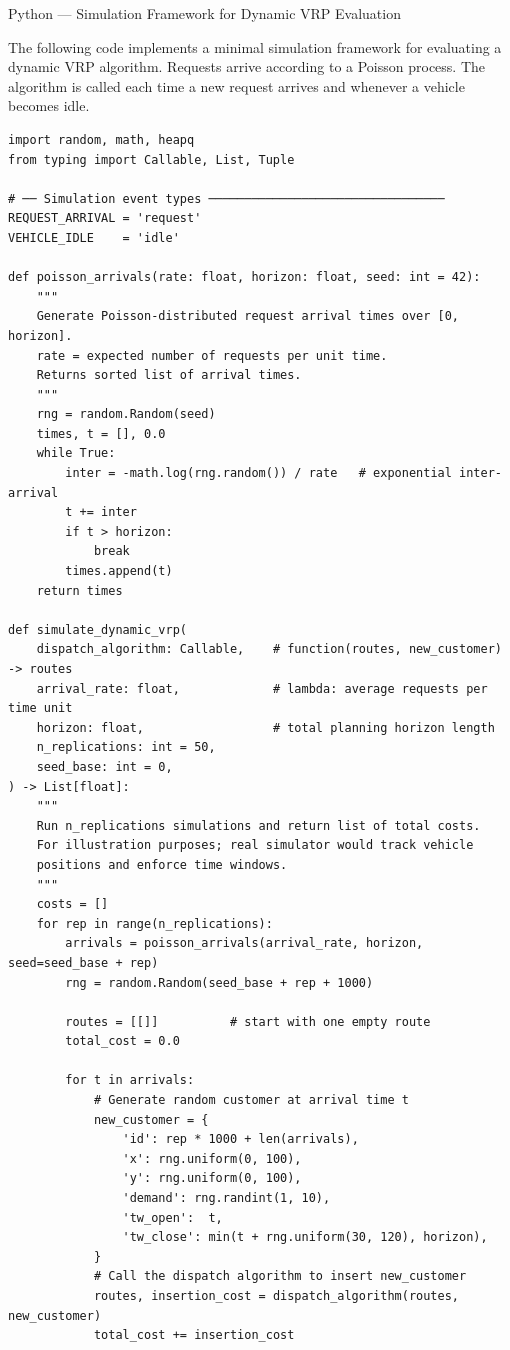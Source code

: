 \documentclass[aspectratio=169,10pt]{beamer}
\begin{document}
\begin{frame}[fragile]{Python — Simulation Framework for Dynamic VRP Evaluation}

The following code implements a minimal simulation framework for evaluating
a dynamic VRP algorithm.  Requests arrive according to a Poisson process.
The algorithm is called each time a new request arrives and whenever a
vehicle becomes idle.

\begin{lstlisting}
import random, math, heapq
from typing import Callable, List, Tuple

# ── Simulation event types ─────────────────────────────────
REQUEST_ARRIVAL = 'request'
VEHICLE_IDLE    = 'idle'

def poisson_arrivals(rate: float, horizon: float, seed: int = 42):
    """
    Generate Poisson-distributed request arrival times over [0, horizon].
    rate = expected number of requests per unit time.
    Returns sorted list of arrival times.
    """
    rng = random.Random(seed)
    times, t = [], 0.0
    while True:
        inter = -math.log(rng.random()) / rate   # exponential inter-arrival
        t += inter
        if t > horizon:
            break
        times.append(t)
    return times

def simulate_dynamic_vrp(
    dispatch_algorithm: Callable,    # function(routes, new_customer) -> routes
    arrival_rate: float,             # lambda: average requests per time unit
    horizon: float,                  # total planning horizon length
    n_replications: int = 50,
    seed_base: int = 0,
) -> List[float]:
    """
    Run n_replications simulations and return list of total costs.
    For illustration purposes; real simulator would track vehicle
    positions and enforce time windows.
    """
    costs = []
    for rep in range(n_replications):
        arrivals = poisson_arrivals(arrival_rate, horizon, seed=seed_base + rep)
        rng = random.Random(seed_base + rep + 1000)

        routes = [[]]          # start with one empty route
        total_cost = 0.0

        for t in arrivals:
            # Generate random customer at arrival time t
            new_customer = {
                'id': rep * 1000 + len(arrivals),
                'x': rng.uniform(0, 100),
                'y': rng.uniform(0, 100),
                'demand': rng.randint(1, 10),
                'tw_open':  t,
                'tw_close': min(t + rng.uniform(30, 120), horizon),
            }
            # Call the dispatch algorithm to insert new_customer
            routes, insertion_cost = dispatch_algorithm(routes, new_customer)
            total_cost += insertion_cost


\end{lstlisting}
\end{frame}
\end{document}
